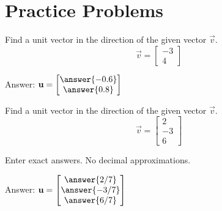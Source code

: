 \documentclass{ximera}
\begin{document}
\section*{Practice Problems}
\begin{problem}\label{prob:00361}
   Find a unit vector in the direction of the given vector $\vec{v}$.
  $$\vec{v}=\begin{bmatrix}-3\\4\end{bmatrix}$$

  Answer: $\vec{u}=\begin{bmatrix}\answer{-0.6}\\\answer{0.8}\end{bmatrix}$
  \end{problem}
  
  \begin{problem}\label{prob:00362}
   Find a unit vector in the direction of the given vector $\vec{v}$.
      $$\vec{v}=\begin{bmatrix}2\\-3\\6\end{bmatrix}$$

Enter exact answers.  No decimal approximations.      

Answer: $\vec{u}=\begin{bmatrix}\answer{2/7}\\\answer{-3/7}\\\answer{6/7}\end{bmatrix}$
   \end{problem}
   

 
\end{document}
